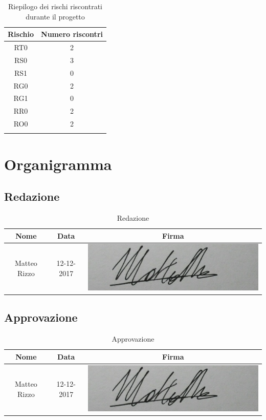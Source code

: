 \documentclass[./PianodiProgetto.tex]{subfiles}
\begin{document}
\begin{longtable}{|c|c|}
	\hline \textbf{Rischio} & \textbf{Numero riscontri} \\
	
	\hline RT0 & 2 \\
	
	\hline RS0 & 3 \\
	
	\hline RS1 & 0 \\
	
	\hline RG0 & 2 \\
	
	\hline RG1 & 0 \\
	
	\hline RR0 & 2 \\
	
	\hline RO0 & 2 \\
	
	\hline
	\caption{Riepilogo dei rischi riscontrati durante il progetto}
\end{longtable}

\chapter{Organigramma}

\section{Redazione}
\begin{table}[H]
	\centering
	\begin{tabular}{|c|c|c|}
		\hline
		Nome&Data&Firma \\ \hline
		Matteo Rizzo& 12-12-2017 &\includegraphics[scale=0.5]{img/firme/RizzoMatteo} \\
		\hline
	\end{tabular}
	\caption{Redazione}
\end{table}

\section{Approvazione}
\begin{table}[H]
	\centering
	\begin{tabular}{|c|c|c|}
		\hline
		Nome&Data&Firma \\ \hline
		Matteo Rizzo& 12-12-2017 & \includegraphics[scale=0.5]{img/firme/RizzoMatteo} \\
		\hline
	\end{tabular}
	\caption{Approvazione}
\end{table}
\end{document}
